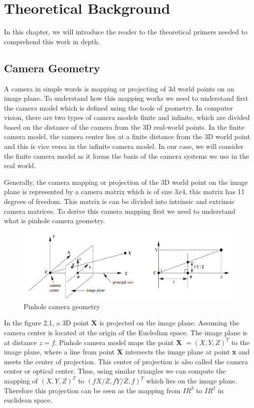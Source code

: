 

    \chapter{Theoretical Background}
    In this chapter, we will introduce the reader to the theoretical primers needed to comprehend this work in depth. 

    \section{Camera Geometry}
    A camera in simple words is mapping or projecting of 3d world points on an image plane. To understand how this mapping works we need to understand first the camera model which is defined using the tools of geometry. In computer vision, there are two types of camera models finite and infinite, which are divided based on the distance of the camera from the 3D real-world points. In the finite camera model, the camera center lies at a finite distance from the 3D world point and this is vice versa in the infinite camera model. In our case, we will consider the finite camera model as it forms the basis of the camera systems we use in the real world. 
    
    Generally, the camera mapping or projection of the 3D world point on the image plane is represented by a camera matrix which is of size $3x4$, this matrix has 11 degrees of freedom. This matrix is can be divided into intrinsic and extrinsic camera matrices. To derive this camera mapping first we need to understand what is pinhole camera geometry. 
    
     \begin{figure}[h]
    \centering
    \includegraphics[width=\textwidth]{images/pinhole_camera.png}
    \caption{Pinhole camera geometry \cite{10.5555/861369}}
    \end{figure}
    
    In the figure 2.1, a 3D point \textbf{X} is projected on the image plane. Assuming the camera center is located at the origin of the Eucledian space. The image plane is at distance $z = f$. Pinhole camera model maps the point  \textbf{X} $ = (X, Y, Z)^{T}$ to the image plane, where a line from point \textbf{X} intersects the image plane at point \textbf{x} and meets the center of projection. This center of projection is also called the camera center or optical center. Thus, using similar triangles we can compute the mapping of $ (X, Y, Z)^{T}$ to $(fX/Z, fY/Z, f)^{T}$ which lies on the image plane. Therefore this projection can be seen as the mapping from $IR^{3}$ to $IR^{2}$ in euclidean space.  
    
